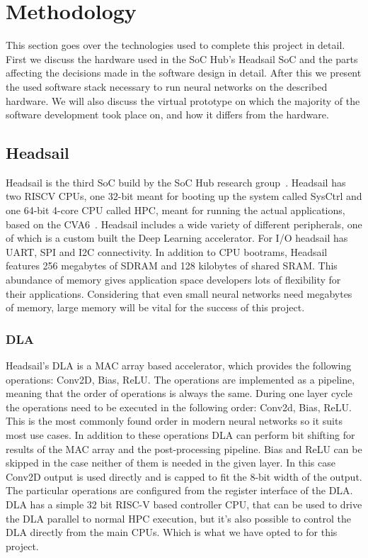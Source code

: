 \documentclass[12pt,a4paper,english
]{tunithesis}
\begin{document}
\chapter{Methodology}
This section goes over the technologies used to complete this project in detail. First we discuss the hardware used in the SoC Hub's Headsail SoC and the parts affecting the decisions made in the software design in detail. After this we present the used software stack necessary to run neural networks on the described hardware. We will also discuss the virtual prototype on which the majority of the software development took place on, and how it differs from the hardware.
\label{ch:methodology}

\section{Headsail}
Headsail is the third SoC build by the SoC Hub research group~\parencite{Ballast}. Headsail has two RISCV CPUs, one 32-bit meant for booting up the system called SysCtrl and one 64-bit 4-core CPU called HPC, meant for running the actual applications, based on the CVA6~\cite{zaruba2019costCVA6}.
Headsail includes a wide variety of different peripherals, one of which is a custom built the Deep Learning accelerator.
For I/O headsail  has UART, SPI and I2C connectivity.
In addition to CPU bootrams, Headsail features 256 megabytes of SDRAM and 128 kilobytes of shared SRAM. This abundance of memory gives application space developers lots of flexibility for their applications. Considering that even small neural networks need megabytes of memory, large memory will be vital for the success of this project.

\subsection{DLA}
Headsail's DLA is a MAC array based accelerator, which provides the following operations: Conv2D, Bias, ReLU. The operations are implemented as a pipeline, meaning that the order of operations is always the same. During one layer cycle the operations need to be executed in the following order: Conv2d, Bias, ReLU. This is the most commonly found order in modern neural networks so it suits most use cases. In addition to these operations DLA can perform bit shifting for results of the MAC array and the post-processing pipeline.
Bias and ReLU can be skipped in the case neither of them is needed in the given layer. In this case Conv2D output is used directly and is capped to fit the 8-bit width of the output.
The particular operations are configured from the register interface of the DLA.
DLA has a simple 32 bit RISC-V based controller CPU, that can be used to drive the DLA parallel to normal HPC execution, but it's also possible to control the DLA directly from the main CPUs. Which is what we have opted to for this project.
\end{document}
